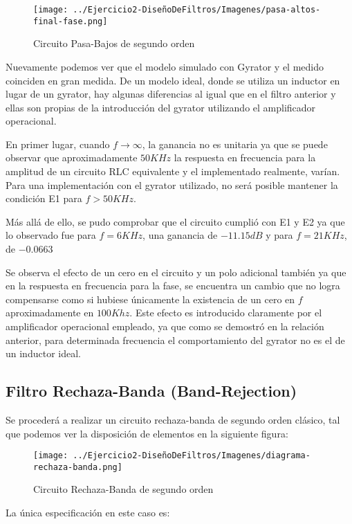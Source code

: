 \begin{figure}[H]
    \centering
    \texttt{[image: ../Ejercicio2-DiseñoDeFiltros/Imagenes/pasa-altos-final-fase.png]}
    \caption{Circuito Pasa-Bajos de segundo orden}
\end{figure}

Nuevamente podemos ver que el modelo simulado con Gyrator y el medido coinciden en gran medida. De un modelo ideal,
donde se utiliza un inductor en lugar de un gyrator, hay algunas diferencias al igual que en el filtro anterior y ellas son 
propias de la introducción del gyrator utilizando el amplificador operacional.

En primer lugar, cuando $f \to \infty$, la ganancia no es unitaria ya que se puede observar que aproximadamente
$50 KHz$ la respuesta en frecuencia para la amplitud de un circuito RLC equivalente y el implementado realmente, varían.
Para una implementación con el gyrator utilizado, no será posible mantener la condición E1 para $f>50KHz$.

Más allá de ello, se pudo comprobar que el circuito cumplió con E1 y E2 ya que lo observado fue para $f=6KHz$, una ganancia
de $-11.15 dB$ y para $f=21 KHz$, de $-0.0663$

Se observa el efecto de un cero en el circuito y un polo adicional también ya que en la respuesta en frecuencia para la fase,
se encuentra un cambio que no logra compensarse como si hubiese únicamente la existencia de un cero en $f$ aproximadamente en $100 Khz$.
Este efecto es introducido claramente por el amplificador operacional empleado, ya que como se demostró en la relación anterior,
para determinada frecuencia el comportamiento del gyrator no es el de un inductor ideal.

\subsection{Filtro Rechaza-Banda (Band-Rejection)}

Se procederá a realizar un circuito rechaza-banda de segundo orden clásico, tal que podemos
ver la disposición de elementos en la siguiente figura:

\begin{figure}[H]
    \centering
    \texttt{[image: ../Ejercicio2-DiseñoDeFiltros/Imagenes/diagrama-rechaza-banda.png]}
    \caption{Circuito Rechaza-Banda de segundo orden}
\end{figure}

La única especificación en este caso es:

